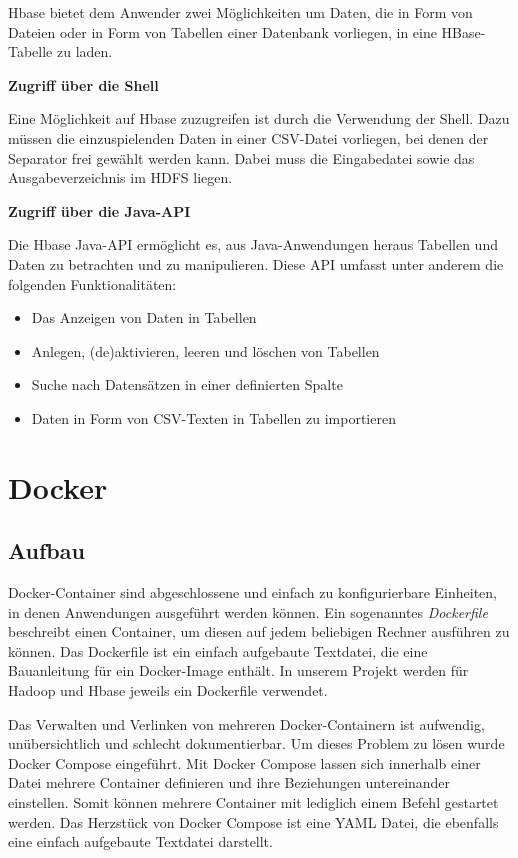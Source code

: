 Hbase bietet dem Anwender zwei Möglichkeiten um Daten, die in Form von Dateien oder in Form von Tabellen einer Datenbank vorliegen, in eine HBase-Tabelle zu laden.

\textbf{Zugriff über die Shell}

Eine Möglichkeit auf Hbase zuzugreifen ist durch die Verwendung der Shell. Dazu müssen die einzuspielenden Daten in einer CSV-Datei vorliegen, bei denen der Separator frei gewählt werden kann. Dabei muss die Eingabedatei sowie das Ausgabeverzeichnis im HDFS liegen.

\textbf{Zugriff über die Java-API}

Die Hbase Java-API ermöglicht es, aus Java-Anwendungen heraus Tabellen und Daten zu betrachten und zu manipulieren. Diese API umfasst unter anderem die folgenden Funktionalitäten:

\begin{itemize}
\item Das Anzeigen von Daten in Tabellen
\item Anlegen, (de)aktivieren, leeren und löschen von Tabellen
\item Suche nach Datensätzen in einer definierten Spalte
\item Daten in Form von CSV-Texten in Tabellen zu importieren
\end{itemize}

\section{Docker}
\label{sec:Docker}

\subsection{Aufbau}
\label{subsec:DockerAufbau}

Docker-Container sind abgeschlossene und einfach zu konfigurierbare Einheiten, in denen Anwendungen ausgeführt werden können. Ein sogenanntes \textit{Dockerfile} beschreibt einen Container, um diesen auf jedem beliebigen Rechner ausführen zu können. Das Dockerfile ist ein einfach aufgebaute Textdatei, die eine Bauanleitung für ein Docker-Image enthält. In unserem Projekt werden für Hadoop und Hbase jeweils ein Dockerfile verwendet. 

Das Verwalten und Verlinken von mehreren Docker-Containern ist aufwendig, unübersichtlich und schlecht dokumentierbar. Um dieses Problem zu lösen wurde Docker Compose eingeführt. Mit Docker Compose lassen sich innerhalb einer Datei mehrere Container definieren und ihre Beziehungen untereinander einstellen. Somit können mehrere Container mit lediglich einem Befehl gestartet werden. Das Herzstück von Docker Compose ist eine YAML Datei, die ebenfalls eine einfach aufgebaute Textdatei darstellt. 

